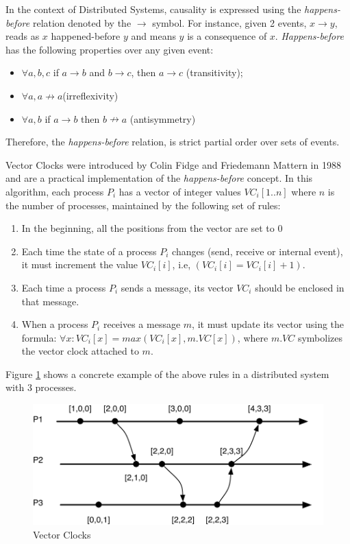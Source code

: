 In the context of Distributed Systems, causality is expressed using the
\textit{happens-before} relation \cite{Lamport:1978} denoted by the
$\rightarrow$ symbol. For instance, given 2 events, $x \rightarrow y$, reads
as $x$ happened-before $y$ and means $y$ is a consequence of
$x$.
 \textit{Happens-before} has the following properties over any given event:
\begin{itemize}
\item $\forall a,b,c$ if $a \rightarrow b$ and $b\rightarrow c$, then $a
  \rightarrow c$ (transitivity);
\item $\forall a, a \nrightarrow a$(irreflexivity)
\item $\forall a,b$ if $a \rightarrow b$ then $b \nrightarrow a$ (antisymmetry)
\end{itemize}

Therefore, the \textit{happens-before} relation, is strict partial order over
sets of events.

Vector Clocks were introduced by Colin Fidge \cite{Fidge} and Friedemann Mattern
\cite{Mattern} in 1988 and are a practical implementation of the
\textit{happens-before} concept.
In this algorithm, each process $P_i$ has a vector of integer values
$VC_i[1..n]$ where $n$ is the number of processes, maintained by the following
set of rules:
\begin{enumerate}
\item In the beginning, all the positions from the vector are set to 0
\item Each time the state of a process $P_i$ changes (send, receive or
  internal event), it must increment
  the value $VC_i[i]$, i.e, $(VC_i[i] = VC_i[i]+1)$.
\item Each time a process $P_i$ sends a message, its vector $VC_i$
  should be enclosed in that message.
\item When a process $P_i$ receives a message $m$, it must update its
  vector using the formula: $\forall x:VC_i[x] = max(VC_i[x],m.VC[x])$,
  where $m.VC$ symbolizes the vector clock attached to $m$.
\end{enumerate}

Figure \ref{fig:vector_clocks} shows a concrete example of the above
rules in a distributed system with 3 processes.

\begin{figure}[htb]
  \centering
  \includegraphics[width=\textwidth]{images/vector_clocks.pdf}
  \caption{ Vector Clocks}
  \label{fig:vector_clocks}
\end{figure}


